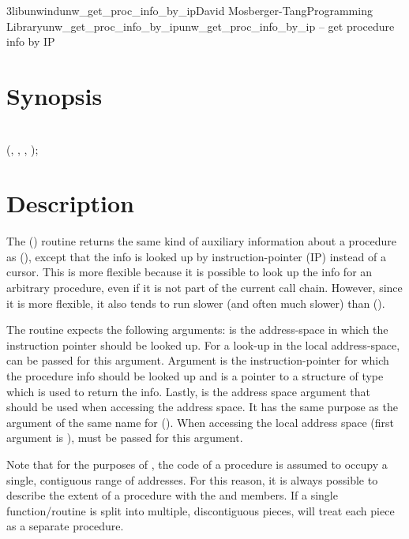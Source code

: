 \documentclass{article}
\begin{document}
\begin{Name}{3libunwind}{unw\_get\_proc\_info\_by\_ip}{David Mosberger-Tang}{Programming Library}{unw\_get\_proc\_info\_by\_ip}unw\_get\_proc\_info\_by\_ip -- get procedure info by IP
\end{Name}

\section{Synopsis}

\\

 (, , , );\\

\section{Description}

The () routine returns the same
kind of auxiliary information about a procedure as
(), except that the info is looked up by
instruction-pointer (IP) instead of a cursor.  This is more flexible
because it is possible to look up the info for an arbitrary procedure,
even if it is not part of the current call chain.  However, since it
is more flexible, it also tends to run slower (and often much slower)
than ().

The routine expects the following arguments:  is the
address-space in which the instruction pointer should be looked up.
For a look-up in the local address-space,
 can be passed for this argument.
Argument  is the instruction-pointer for which the procedure
info should be looked up and  is a pointer to a structure of
type  which is used to return the info.
Lastly,  is the address space argument that should be used
when accessing the address space.  It has the same purpose as the
argument of the same name for ().  When
accessing the local address space (first argument is
),  must be passed for this
argument.

Note that for the purposes of , the code of a
procedure is assumed to occupy a single, contiguous range of
addresses.  For this reason, it is always possible to describe the
extent of a procedure with the  and 
members.  If a single function/routine is split into multiple,
discontiguous pieces,  will treat each piece as a
separate procedure.
\end{document}
